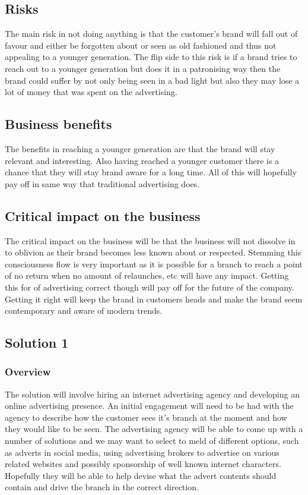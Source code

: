 \documentclass{article}
\begin{document}
\subsection{Risks}
The main risk in not doing anything is that the customer's brand will fall out of favour and either be forgotten about or seen as old fashioned and thus not appealing to a younger generation. 
The flip side to this risk is if a brand tries to reach out to a younger generation but does it in a patronising way then the brand could suffer by not only being seen in a bad light but also they may lose a lot of money that was spent on the advertising.

\subsection{Business benefits}
The benefits in reaching a younger generation are that the brand will stay relevant and interesting. Also having reached a younger customer there is a chance that they will stay brand aware for a long time. All of this will hopefully pay off in same way that traditional advertising does.

\subsection{Critical impact on the business}
The critical impact on the business will be that the business will not dissolve in to oblivion as their brand becomes less known about or respected. Stemming this consciousness flow is very important as it is possible for a branch to reach a point of no return when no amount of relaunches, etc will have any impact.
Getting this for of advertising correct though will pay off for the future of the company. Getting it right will keep the brand in customers heads and make the brand seem contemporary and aware of modern trends.

\break
\subsection{Solution 1}
\subsubsection{Overview}
The solution will involve hiring an internet advertising agency and developing an online advertising presence. An initial engagement will need to be had with the agency to describe how the customer sees it's branch at the moment and how they would like to be seen. 
The advertising agency will be able to come up with a number of solutions and we may want to select to meld of different options, such as adverts in social media, using advertising brokers to advertise on various related websites and possibly sponsorship of well known internet characters.
Hopefully they will be able to help devise what the advert contents should contain and drive the branch in the correct direction.
\end{document}
